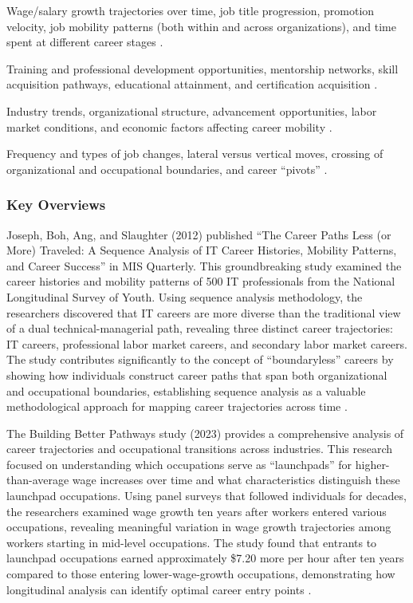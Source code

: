 \documentclass[../main.tex]{subfiles}
\begin{document}
Wage/salary growth trajectories over time, job title progression, promotion velocity, job mobility patterns (both within and across organizations), and time spent at different career stages \citep{workforcegps2023}.

Training and professional development opportunities, mentorship networks, skill acquisition pathways, educational attainment, and certification acquisition \citep{collegerecruiter2025,ncsu2023}.

Industry trends, organizational structure, advancement opportunities, labor market conditions, and economic factors affecting career mobility \citep{chronus2023}.

Frequency and types of job changes, lateral versus vertical moves, crossing of organizational and occupational boundaries, and career ``pivots'' \citep{joseph2012}.

\subsubsection{Key Overviews}

Joseph, Boh, Ang, and Slaughter (2012) published ``The Career Paths Less (or More) Traveled: A Sequence Analysis of IT Career Histories, Mobility Patterns, and Career Success'' in MIS Quarterly. This groundbreaking study examined the career histories and mobility patterns of 500 IT professionals from the National Longitudinal Survey of Youth. Using sequence analysis methodology, the researchers discovered that IT careers are more diverse than the traditional view of a dual technical-managerial path, revealing three distinct career trajectories: IT careers, professional labor market careers, and secondary labor market careers. The study contributes significantly to the concept of ``boundaryless'' careers by showing how individuals construct career paths that span both organizational and occupational boundaries, establishing sequence analysis as a valuable methodological approach for mapping career trajectories across time \citep{joseph2012}.

The Building Better Pathways study (2023) provides a comprehensive analysis of career trajectories and occupational transitions across industries. This research focused on understanding which occupations serve as ``launchpads'' for higher-than-average wage increases over time and what characteristics distinguish these launchpad occupations. Using panel surveys that followed individuals for decades, the researchers examined wage growth ten years after workers entered various occupations, revealing meaningful variation in wage growth trajectories among workers starting in mid-level occupations. The study found that entrants to launchpad occupations earned approximately \$7.20 more per hour after ten years compared to those entering lower-wage-growth occupations, demonstrating how longitudinal analysis can identify optimal career entry points \citep{workforcegps2023}.
\end{document}
